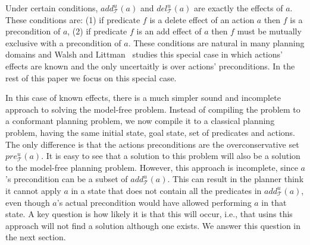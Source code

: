 \documentclass[letterpaper]{article}
\begin{document}
 Under certain conditions, $add_\mathcal{T}^u(a)$ 
 and $del_\mathcal{T}^u(a)$ are exactly the effects of $a$. These conditions are:
 (1) if predicate $f$ is a delete effect of an action $a$ then $f$ is a precondition of $a$, 
 (2) if predicate $f$ is an add effect of $a$ then $f$ must be mutually exclusive with a precondition of $a$. 
 These conditions are natural in many planning domains and Walsh and Littman~ studies this special case in which actions' effects are known and the only uncertaitly is over actions' preconditions. 
 In the rest of this paper we focus on this special case. 
 
    
    In this case of known effects, there is a much simpler sound and incomplete approach to solving the model-free problem. Instead of compiling the problem to a conformant planning problem, we now compile it to a classical planning problem, having the same initial state, goal state, set of predicates and actions. The only difference is that the actions preconditions are the overconservative set $pre_\mathcal{T}^u(a)$. It is easy to see that a solution to this problem will also be a solution to the model-free planning problem. However, this approach is incomplete, since $a$'s precondition can be a subset of $add_\mathcal{T}^u(a)$. This can result in the planner think it cannot apply $a$ in a state that does not contain all the predicates in $add_\mathcal{T}^u(a)$, even though $a$'s actual precondition would have allowed performing $a$ in that state. A key question is how likely it is that this will occur, i.e., that usins this approach will not find a solution although one exists. We answer this question in the next section. 
\end{document}
